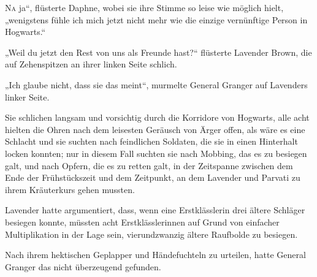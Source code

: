 
\lettrine[ante=„]{N}{a} ja“, flüsterte Daphne, wobei sie ihre Stimme so leise wie möglich hielt, „wenigstens fühle ich mich jetzt nicht mehr wie die einzige vernünftige Person in Hogwarts.“

„Weil du jetzt den Rest von uns als Freunde hast?“ flüsterte Lavender Brown, die auf Zehenspitzen an ihrer linken Seite schlich.

„Ich glaube nicht, dass sie das meint“, murmelte General Granger auf Lavenders linker Seite.

Sie schlichen langsam und vorsichtig durch die Korridore von Hogwarts, alle acht hielten die Ohren nach dem leisesten Geräusch von Ärger offen, als wäre es eine Schlacht und sie suchten nach feindlichen Soldaten, die sie in einen Hinterhalt locken konnten; nur in diesem Fall suchten sie nach Mobbing, das es zu besiegen galt, und nach Opfern, die es zu retten galt, in der Zeitspanne zwischen dem Ende der Frühstückszeit und dem Zeitpunkt, an dem Lavender und Parvati zu ihrem Kräuterkurs gehen mussten.

Lavender hatte argumentiert, dass, wenn eine Erstklässlerin drei ältere Schläger besiegen konnte, müssten acht Erstklässlerinnen auf Grund von einfacher Multiplikation in der Lage sein, vierundzwanzig ältere Raufbolde zu besiegen.

Nach ihrem hektischen Geplapper und Händefuchteln zu urteilen, hatte General Granger das nicht überzeugend gefunden.

